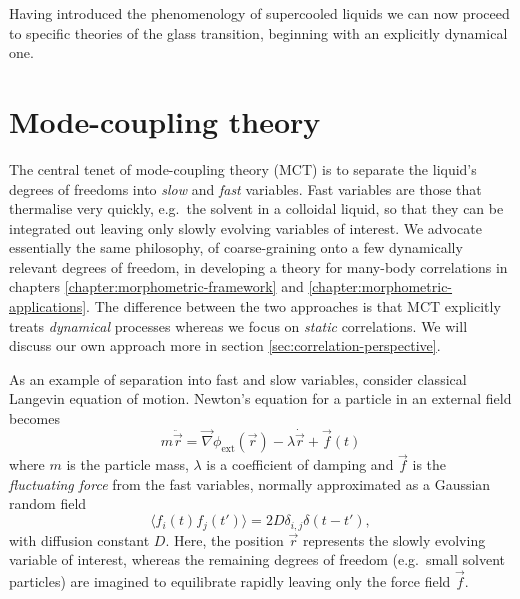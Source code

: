 \documentclass[11pt,twoside]{report}
\begin{document}
Having introduced the phenomenology of supercooled liquids we can now proceed to specific theories of the glass transition, beginning with an explicitly dynamical one.

\section{Mode-coupling theory}
\label{sec:mct}

The central tenet of mode-coupling theory (MCT) is to separate the liquid's degrees of freedoms into \emph{slow} and \emph{fast} variables.
Fast variables are those that thermalise very quickly, e.g.\ the solvent in a colloidal liquid, so that they can be integrated out leaving only slowly evolving variables of interest.
We advocate essentially the same philosophy, of coarse-graining onto a few dynamically relevant degrees of freedom, in developing a theory for many-body correlations in chapters \ref{chapter:morphometric-framework} and \ref{chapter:morphometric-applications}.
The difference between the two approaches is that MCT explicitly treats \emph{dynamical} processes whereas we focus on \emph{static} correlations.
We will discuss our own approach more in section \ref{sec:correlation-perspective}.

As an example of separation into fast and slow variables, consider classical Langevin equation of motion.
Newton's equation for a particle in an external field becomes
\begin{equation}\label{eq:classical-langevin}
  m \ddot{\vec{r}}
  =
  \vec{\nabla} \phi_\mathrm{ext}(\vec{r})
  - \lambda \dot{\vec{r}} + \vec{f}(t)
\end{equation}
where $m$ is the particle mass, $\lambda$ is a coefficient of damping and $\vec{f}$ is the \emph{fluctuating force} from the fast variables, normally approximated as a Gaussian random field
\begin{equation*}
  \langle f_i(t) f_j(t') \rangle = 2 D \delta_{i,j} \delta(t - t'),
\end{equation*}
with diffusion constant $D$.
Here, the position $\vec{r}$ represents the slowly evolving variable of interest, whereas the remaining degrees of freedom (e.g.\ small solvent particles) are imagined to equilibrate rapidly leaving only the force field $\vec{f}$.
\end{document}
